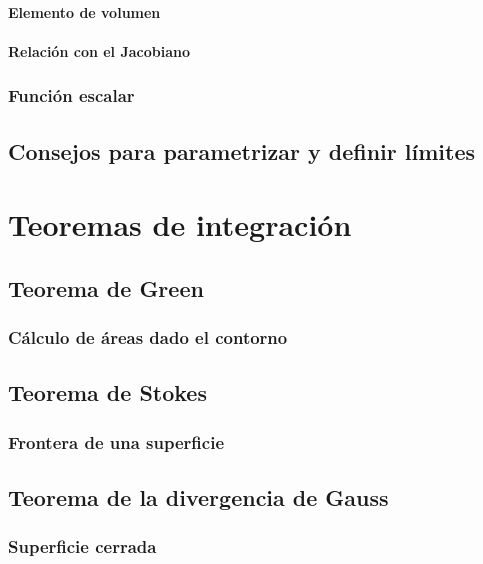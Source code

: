 \documentclass[12pt, fleqn]{report}                             %
\begin{document}
                \subsubsection{Elemento de volumen}
                
                \subsubsection{Relación con el Jacobiano}
        
            \subsection{Función escalar}
            
        \section{Consejos para parametrizar y definir límites}
    
    \chapter{Teoremas de integración}
    
        \section{Teorema de Green}
        
            \subsection{Cálculo de áreas dado el contorno}
        
        \section{Teorema de Stokes}
        
            \subsection{Frontera de una superficie}
        
        \section{Teorema de la divergencia de Gauss}
        
            \subsection{Superficie cerrada}
\end{document}

